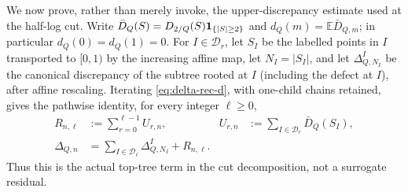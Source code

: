 \documentclass[11pt]{article}
\numberwithin{equation}{section}
\newcommand{\1}{\mathbf 1}\newcommand{\F}{\mathcal F}\newcommand{\D}{\mathcal D}
\begin{document}
We now prove, rather than merely invoke, the upper-discrepancy estimate used
at the half-log cut.  Write
$\bar D_Q(S)=D_{2/Q}(S){\bf1}_{\{|S|\ge2\}}$ and
$d_Q(m)=\mathbb E\bar D_{Q,m}$; in particular $d_Q(0)=d_Q(1)=0$.
For $I\in\mathcal D_r$, let $S_I$ be the labelled points in $I$ transported
to $[0,1)$ by the increasing affine map, let $N_I=|S_I|$, and let
$\Delta^I_{Q,N_I}$ be the canonical discrepancy of the subtree
rooted at $I$ (including the defect at $I$), after affine rescaling.  Iterating
\eqref{eq:delta-rec-d}, with one-child chains retained, gives the pathwise
identity, for every integer $\ell\ge0$,
\begin{align}
 R_{n,\ell}&:=\sum_{r=0}^{\ell-1}U_{r,n},&
 U_{r,n}&:=\sum_{I\in\mathcal D_r}\bar D_Q(S_I),
                                                        \label{eq:halfres-d}\\
 \Delta_{Q,n}&=\sum_{I\in\mathcal D_\ell}\Delta^I_{Q,N_I}
                  +R_{n,\ell}.                         \label{eq:halfres-identity-d}
\end{align}
Thus this is the actual top-tree term in the cut decomposition, not a
surrogate residual.
\end{document}
